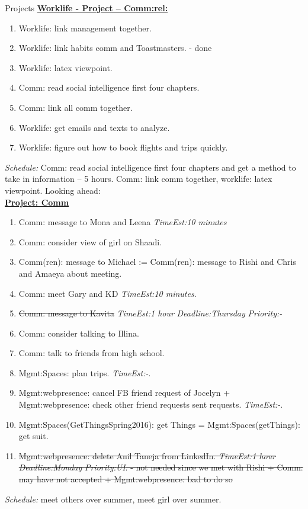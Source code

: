 \documentclass[serif, mathserif, final]{beamer}
\newcommand{\doneTask}[1]{\tiny \item \tiny \sout{#1}}
\newcommand{\te}[1]{\textit{TimeEst:}\textit{#1}}
\newcommand{\dl}[1]{\textit{Deadline:}\textit{#1}}
\newcommand{\pr}[1]{\textit{Priority:}\textit{#1}}
\begin{document}
\begin{frame}
\begin{columns}
\begin{column}{0.5\textwidth}
\begin{block}{Projects}
{\underline{\textbf{Worklife - Project – Comm:rel:}}}
\begin{enumerate} 
  \tiny \item \tiny Worklife: link management together.  
\item \tiny Worklife: link habits comm and Toastmasters. - done
\item \tiny Worklife: latex viewpoint. 
\item \tiny Comm: read social intelligence first four chapters.
\item \tiny Comm: link all comm together.
\item \tiny Worklife: get emails and texts to analyze. 
\item \tiny Worklife: figure out how to book flights and trips quickly. 
\end{enumerate}
\textit{Schedule:} Comm: read social intelligence first four chapters
and get a method to take in information – 5 hours. Comm: link comm together, worklife: latex viewpoint. Looking ahead:  \\
{\underline{\textbf{ Project: Comm}}}
\begin{enumerate}
  \tiny \item \tiny Comm: message to Mona and Leena \te{10 minutes} 
\item \tiny Comm: consider view of girl on Shaadi. 
\item \tiny Comm(ren): message to Michael :=  Comm(ren): message to
  Rishi and Chris and Amaeya about meeting. 

\item \tiny Comm: meet Gary and KD \te{10 minutes}.
  \doneTask{Comm: message to Kavita} 
\te{1 hour} \dl{Thursday} \pr{-}
      \item \tiny Comm: consider talking to Illina.
      \item \tiny Comm: talk to friends from high school.
      \item \tiny Mgmt:Spaces: plan trips. \te{-}.
      \item \tiny Mgmt:webpresence: cancel FB friend request of
        Jocelyn + Mgmt:webpresence: check other friend requests
        sent requests. \te{-}.
      \item \tiny Mgmt:Spaces(GetThingsSpring2016): get Things =
        Mgmt:Spaces(getThings): get suit. 
      \doneTask{Mgmt:webpresence: delete Anil Taneja from
        LinkedIn. \te{1 hour} \dl{Monday} \pr{UI}. - not needed since
        we met with Rishi  + Comm: may have not accepted +
        Mgmt:webpresence: bad to do so}
\end{enumerate}
{\it Schedule:} meet others over summer, meet girl over summer.\\


\end{block}
\end{column}
\end{columns}
\end{frame}
\end{document}

